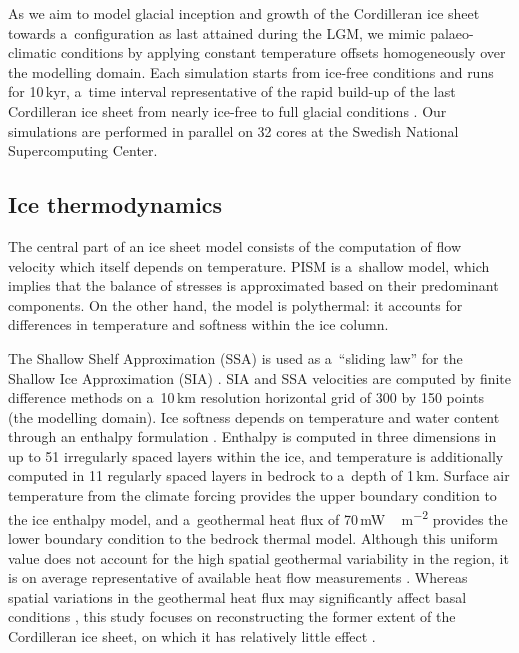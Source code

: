 \documentclass[tc, ms]{copernicus}
\begin{document}
As we aim to model glacial inception and growth of the Cordilleran ice sheet towards a~configuration as last attained during the LGM, we mimic palaeo-climatic conditions by applying constant temperature offsets homogeneously over the modelling domain. Each simulation starts from ice-free conditions and runs for 10\,kyr, a~time interval representative of the rapid build-up of the last Cordilleran ice sheet from nearly ice-free to full glacial conditions \citep{clague-1989,stroeven-etal-2010}. Our simulations are performed in parallel on 32 cores at the Swedish National Supercomputing Center.

\subsection{Ice thermodynamics}

The central part of an ice sheet model consists of the computation of flow velocity which itself depends on temperature. PISM is a~shallow model, which implies that the balance of stresses is approximated based on their predominant components. On the other hand, the model is polythermal: it accounts for differences in temperature and softness within the ice column.

The Shallow Shelf Approximation (SSA) is used as a~``sliding law'' for the Shallow Ice Approximation (SIA) \citep{bueler-brown-2009,winkelmann-etal-2011}. SIA and SSA velocities are computed by finite difference methods on a~10\,km resolution horizontal grid of 300 by 150 points (the modelling domain). Ice softness depends on temperature and water content through an enthalpy formulation \citep{aschwanden-blatter-2009,aschwanden-etal-2012}. Enthalpy is computed in three dimensions in up to 51 irregularly spaced layers within the ice, and temperature is additionally computed in 11 regularly spaced layers in bedrock to a~depth of 1\,km. Surface air temperature from the climate forcing provides the upper boundary condition to the ice enthalpy model, and a~geothermal heat flux of 70\,\unit{mW\,m^{-2}} provides the lower boundary condition to the bedrock thermal model. Although this uniform value does not account for the high spatial geothermal variability in the region, it is on average representative of available heat flow measurements \citep{artemieva-mooney-2001,blackwell-richards-2004}. Whereas spatial variations in the geothermal heat flux may significantly affect basal conditions \citep{pattyn-2010}, this study focuses on reconstructing the former extent of the Cordilleran ice sheet, on which it has relatively little effect \citep{rogozhina-etal-2012}.
\end{document}

